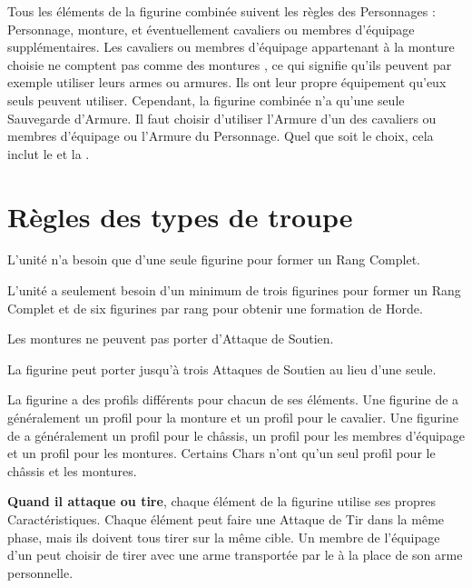 Tous les éléments de la figurine combinée suivent les règles des Personnages : Personnage, monture, et éventuellement cavaliers ou membres d'équipage supplémentaires. Les cavaliers ou membres d'équipage appartenant à la monture choisie ne comptent pas comme des \og montures \fg{}, ce qui signifie qu'ils peuvent par exemple utiliser leurs armes ou armures. Ils ont leur propre équipement qu'eux seuls peuvent utiliser. Cependant, la figurine combinée n'a qu'une seule Sauvegarde d'Armure. Il faut choisir d'utiliser l'Armure d'un des cavaliers ou membres d'équipage ou l'Armure du Personnage. Quel que soit le choix, cela inclut le \barding{} et la \mountsprotection{}.

\section{Règles des types de troupe}

\noindent\textbf{\newfromWHB{\monsterranks}}

L'unité n'a besoin que d'une seule figurine pour former un Rang Complet.

\noindent\textbf{\monstrousranks}

L'unité a seulement besoin d'un minimum de trois figurines pour former un Rang Complet et de six figurines par rang pour obtenir une formation de Horde.

\noindent\textbf{\cavalrysupport}

Les montures ne peuvent pas porter d'Attaque de Soutien.

\noindent\textbf{\monstroussupport}

La figurine peut porter jusqu'à trois Attaques de Soutien au lieu d'une seule.

\newpage
\noindent\textbf{\combinedprofile}

La figurine a des profils différents pour chacun de ses éléments. Une figurine de \cavalry{} a généralement un profil pour la monture et un profil pour le cavalier. Une figurine de \chariot{} a généralement un profil pour le châssis, un profil pour les membres d'équipage et un profil pour les montures. Certains Chars n'ont qu'un seul profil pour le châssis et les montures.

\textbf{Quand il attaque ou tire}, chaque élément de la figurine utilise ses propres Caractéristiques. Chaque élément peut faire une Attaque de Tir dans la même phase, mais ils doivent tous tirer sur la même cible. Un membre de l'équipage d'un \chariot{} peut choisir de tirer avec une arme transportée par le \chariot{} à la place de son arme personnelle.


